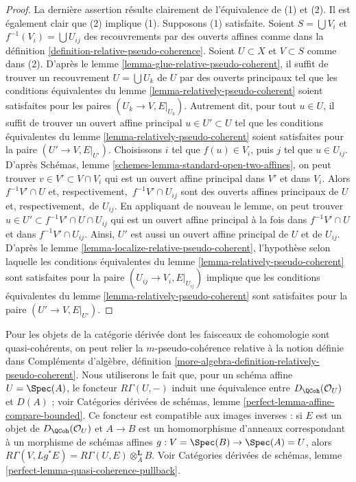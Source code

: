 \begin{proof}
La dernière assertion résulte clairement de l'équivalence de (1) et (2).
Il est également clair que (2) implique (1). Supposons (1) satisfaite.
Soient $S = \bigcup V_i$ et $f^{-1}(V_i) = \bigcup U_{ij}$ des
recouvrements par des ouverts affines comme dans la
définition \ref{definition-relative-pseudo-coherence}.
Soient $U \subset X$ et $V \subset S$ comme dans (2).
D'après le lemme \ref{lemma-glue-relative-pseudo-coherent},
il suffit de trouver un recouvrement $U = \bigcup U_k$ de $U$ par des ouverts principaux
tel que les conditions équivalentes du
lemme \ref{lemma-relatively-pseudo-coherent}
soient satisfaites pour les paires $(U_k \to V, E|_{U_k})$.
Autrement dit, pour tout $u \in U$, il suffit
de trouver un ouvert affine principal $u \in U' \subset U$ tel que
les conditions équivalentes du
lemme \ref{lemma-relatively-pseudo-coherent}
soient satisfaites pour la paire $(U' \to V, E|_{U'})$.
Choisissons $i$ tel que $f(u) \in V_i$, puis $j$ tel que
$u \in U_{ij}$. D'après
Schémas, lemme \ref{schemes-lemma-standard-open-two-affines},
on peut trouver $v \in V' \subset V \cap V_i$ qui est un ouvert affine principal
dans $V'$ et dans $V_i$. Alors $f^{-1}V'  \cap U$ et, respectivement,\ $f^{-1}V' \cap U_{ij}$
sont des ouverts affines principaux de $U$ et, respectivement,\ de $U_{ij}$.
En appliquant de nouveau le lemme, on peut trouver
$u \in U' \subset f^{-1}V' \cap U \cap U_{ij}$ qui est un ouvert affine principal
à la fois dans $f^{-1}V'  \cap U$ et dans $f^{-1}V' \cap U_{ij}$.
Ainsi, $U'$ est aussi un ouvert affine principal de $U$ et de $U_{ij}$.
D'après le lemme \ref{lemma-localize-relative-pseudo-coherent},
l'hypothèse selon laquelle les conditions équivalentes du
lemme \ref{lemma-relatively-pseudo-coherent}
sont satisfaites pour la paire $(U_{ij} \to V_i, E|_{U_{ij}})$
implique que les conditions équivalentes du
lemme \ref{lemma-relatively-pseudo-coherent}
sont satisfaites pour la paire $(U' \to V, E|_{U'})$.
\end{proof}

\noindent
Pour les objets de la catégorie dérivée dont les faisceaux de cohomologie sont
quasi-cohérents, on peut relier la $m$-pseudo-cohérence relative
à la notion définie dans Compléments d'algèbre, définition
\ref{more-algebra-definition-relatively-pseudo-coherent}.
Nous utiliserons le fait que, pour un schéma affine
$U = \Spec(A)$, le foncteur $R\Gamma(U, -)$ induit une équivalence
entre $D_\QCoh(\mathcal{O}_U)$ et $D(A)$ ; voir
Catégories dérivées de schémas, lemme
\ref{perfect-lemma-affine-compare-bounded}.
Ce foncteur est compatible aux images inverses :
si $E$ est un objet de $D_\QCoh(\mathcal{O}_U)$
et $A \to B$ est un homomorphisme d'anneaux correspondant à un morphisme de
schémas affines $g : V = \Spec(B) \to \Spec(A) = U$, alors
$R\Gamma(V, Lg^*E) = R\Gamma(U, E) \otimes_A^\mathbf{L} B$.
Voir Catégories dérivées de schémas, lemme
\ref{perfect-lemma-quasi-coherence-pullback}.

